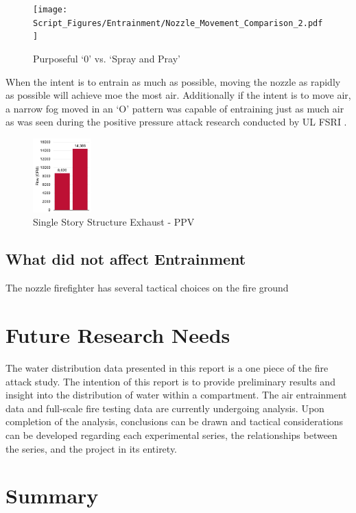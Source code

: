\documentclass[12pt,oneside]{book}
\begin{document}
\begin{figure}[!ht]
\centering
\texttt{[image: Script\_Figures/Entrainment/Nozzle\_Movement\_Comparison\_2.pdf]}
\caption{Purposeful `0' vs. `Spray and Pray'}
\label{fig:Pattern_Compare_2}
\end{figure}

When the intent is to entrain as much as possible, moving the nozzle as rapidly as possible will achieve moe the most air. Additionally if the intent is to move air, a narrow fog moved in an `O' pattern was capable of entraining just as much air as was seen during the positive pressure attack research conducted by UL FSRI \cite{Zevotek_Kerber:2016}. 

\begin{figure}[!ht]
\centering
\includegraphics[width=0.2\textwidth]{Figures/Air_Entrainment/PPV_Comparison.png}
\caption{Single Story Structure Exhaust - PPV \cite{Zevotek_Kerber:2016}}
\label{fig:PPV}
\end{figure}


\section{What did not affect Entrainment}
The nozzle firefighter has several tactical choices on the fire ground 


\chapter{Future Research Needs}

The water distribution data presented in this report is a one piece of the fire attack study. The intention of this report is to provide preliminary results and insight into the distribution of water within a compartment. The air entrainment data and full-scale fire testing data are currently undergoing analysis. Upon completion of the analysis, conclusions can be drawn and tactical considerations can be developed regarding each experimental series, the relationships between the series, and the project in its entirety.  

\chapter{Summary}
\end{document}
